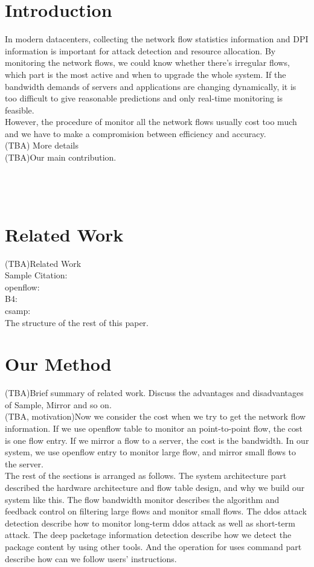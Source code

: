 \documentclass{acm_proc_article-sp}
\begin{document}


\section{Introduction}
In modern datacenters, collecting the network flow statistics information and DPI information is important for attack detection and resource allocation. By monitoring the network flows, we could know whether there's irregular flows, which part is the most active and when to upgrade the whole system. If the bandwidth demands of servers and applications are changing dynamically, it is too difficult to give reasonable predictions and only real-time monitoring is feasible.\\
However, the procedure of monitor all the network flows usually cost too much and we have to make a compromision between efficiency and accuracy.\\ 
(TBA) More details\\
(TBA)Our main contribution.\\
\\
\\
\\


\section{Related Work}
(TBA)Related Work\\
Sample Citation:\\
openflow: \cite{openflow-2511}\\
B4: \cite{google-b4-225}\\
csamp: \cite{csamp-97}\\

The structure of the rest of this paper.

\section{Our Method}
(TBA)Brief summary of related work. Discuss the advantages and disadvantages of Sample, Mirror and so on.\\
(TBA, motivation)Now we consider the cost when we try to get the network flow information. If we use openflow table to monitor an point-to-point flow, the cost is one flow entry. If we mirror a flow to a server, the cost is the bandwidth. In our system, we use openflow entry to monitor large flow, and mirror small flows to the server.\\
The rest of the sections is arranged as follows. The system architecture part described the hardware architecture and flow table design, and why we build our system like this. The flow bandwidth monitor describes the algorithm and feedback control on filtering large flows and monitor small flows. The ddos attack detection describe how to monitor long-term ddos attack as well as short-term attack. The deep packetage information detection describe how we detect the package content by using other tools. And the operation for uses command part describe how can we follow users' instructions.\\
\end{document}
